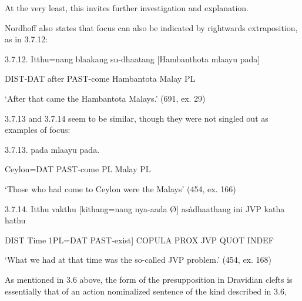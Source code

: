 \documentclass[letterpaper]{article}
\begin{document}
 At the very least, this invites further investigation and explanation.

 Nordhoff also states that focus can also be indicated by rightwards extraposition, as in 3.7.12:

 3.7.12. 
\ea
\gll Itthu=nang blaakang su-dhaatang [Hambanthota mlaayu pada]

  DIST-DAT after  PAST-come Hambantota Malay  PL

  `After that came the Hambantota Malays.'  (691, ex. 29)

 3.7.13 and 3.7.14 seem to be similar, though they were not singled out as examples of focus:

 3.7.13. 
\ea
\gll [Seelon=nang anà dhaatang {\O}] pada mlaayu pada.

  Ceylon=DAT PAST-come  PL Malay  PL

  `Those who had come to Ceylon were the Malays'  (454, ex. 166)

 3.7.14. 
\ea
\gll Itthu vakthu [kithang=nang nya-aada {\O}] asàdhaathang ini JVP katha hathu

 DIST Time 1PL=DAT  PAST-exist] COPULA PROX JVP QUOT INDEF 

 `What we had at that time was the so-called JVP problem.' (454, ex. 168)

 As mentioned in 3.6 above, the form of the presupposition in Dravidian clefts is essentially that of an action nominalized sentence of the kind described in 3.6,  
\end{document}
